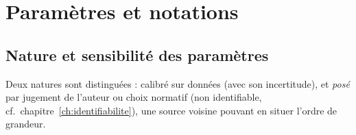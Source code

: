 ﻿%

%
%
%
%

\chapter{Paramètres et notations}
\label{sec:ann-parametres}

\section{Nature et sensibilité des paramètres}

Deux natures sont distinguées : calibré sur données (avec son incertitude), et
\emph{posé} par jugement de l'auteur ou choix normatif (non identifiable, cf.\
chapitre~\ref{ch:identifiabilite}), une source voisine pouvant en situer l'ordre de grandeur.

